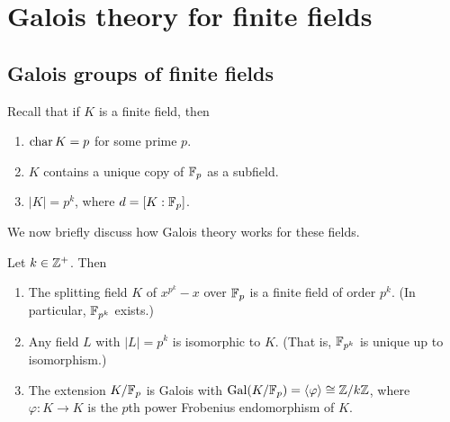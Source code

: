 \chapter{Galois theory for finite fields}

\section{Galois groups of finite fields}

Recall that if $K$ is a finite field, then
\begin{enumerate}[label=(\alph*)]
    \item $\operatorname{char}{{K}} = p$ for some prime $p$.
    \item $K$ contains a unique copy of $\mathbb{{F}}_p$ as a subfield.
    \item $|K| = p^k$, where $d = [K : \mathbb{{F}}_p]$.
\end{enumerate}
We now briefly discuss how Galois theory works for these fields.

\begin{proposition}
    Let $k \in \mathbb{{Z}}^{+}$. Then
    \begin{enumerate}[label=(\alph*)]
        \item The splitting field $K$ of $x^{p^k} - x$ over $\mathbb{{F}}_p$ is a finite field of order $p^k$. (In particular, $\mathbb{{F}}_{p^k}$ exists.)
        \item Any field $L$ with $|L| = p^k$ is isomorphic to $K$. (That is, $\mathbb{{F}}_{p^k}$ is unique up to isomorphism.)
        \item The extension $K/\mathbb{{F}}_p$ is Galois with $\operatorname{Gal}(K/\mathbb{{F}}_p) = \langle {\varphi} \rangle \cong \mathbb{{Z}}/{{k}}\mathbb{{Z}}$, where $\varphi: K \to K$ is the $p$th power Frobenius endomorphism of $K$. 
    \end{enumerate}
\end{proposition}

